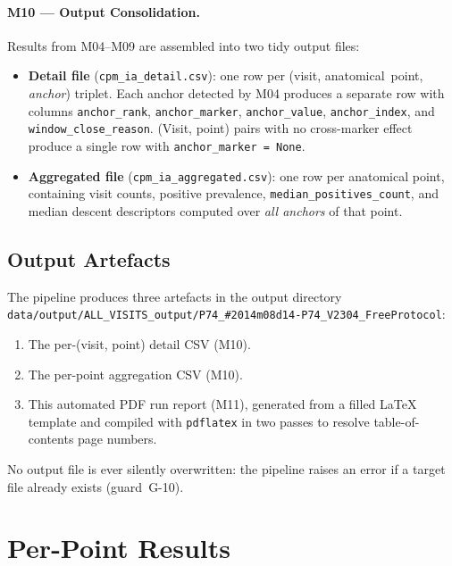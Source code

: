 \documentclass[a4paper,11pt]{article}
\begin{document}
\paragraph{M10 --- Output Consolidation.}
Results from M04--M09 are assembled into two tidy output files:
\begin{itemize}
  \item \textbf{Detail file} (\texttt{cpm\_ia\_detail.csv}): one row per
        (visit, anatomical~point, \emph{anchor}) triplet. Each anchor detected by M04
        produces a separate row with columns \texttt{anchor\_rank},
        \texttt{anchor\_marker}, \texttt{anchor\_value}, \texttt{anchor\_index},
        and \texttt{window\_close\_reason}.
        (Visit, point) pairs with no cross-marker effect produce a single row with
        \texttt{anchor\_marker = None}.
  \item \textbf{Aggregated file} (\texttt{cpm\_ia\_aggregated.csv}): one row per
        anatomical point, containing visit counts, positive prevalence,
        \texttt{median\_positives\_count}, and median descent descriptors computed over
        \emph{all anchors} of that point.
\end{itemize}

\subsection{Output Artefacts}

The pipeline produces three artefacts in the output directory \texttt{data/output/ALL\_VISITS\_output/P74\_\#2014m08d14-P74\_V2304\_FreeProtocol}:
\begin{enumerate}
  \item The per-(visit, point) detail CSV (M10).
  \item The per-point aggregation CSV (M10).
  \item This automated PDF run report (M11), generated from a filled \LaTeX{} template
        and compiled with \texttt{pdflatex} in two passes to resolve table-of-contents
        page numbers.
\end{enumerate}
No output file is ever silently overwritten: the pipeline raises an error if a target
file already exists (guard~G-10).

\section{Per-Point Results}
\end{document}
